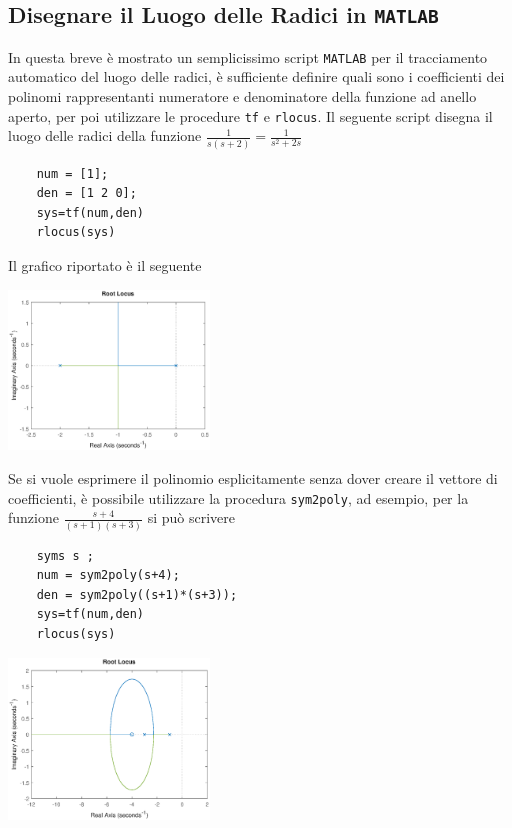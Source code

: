 \documentclass[10pt, letterpaper]{report}
\begin{document}
\subsection{Disegnare il Luogo delle Radici in \texttt{MATLAB}}
In questa breve è mostrato un semplicissimo script  \texttt{MATLAB} per il tracciamento automatico del luogo delle radici, è sufficiente definire quali sono i coefficienti dei polinomi rappresentanti numeratore e denominatore della funzione ad anello aperto, per poi utilizzare le procedure \texttt{tf} e \texttt{rlocus}. Il seguente script disegna il luogo delle radici della funzione $\frac{1}{s(s+2)}=\frac{1}{s^2+2s}$ 
\begin{lstlisting}
    num = [1];
    den = [1 2 0];
    sys=tf(num,den)
    rlocus(sys)
\end{lstlisting}
Il grafico riportato è il seguente
\begin{center}
    \includegraphics[width=0.4\textwidth ]{images/luogoRadMATLAB1.eps}
\end{center}
Se si vuole esprimere il polinomio esplicitamente senza dover creare il vettore di coefficienti, è possibile utilizzare la procedura \texttt{sym2poly}, ad esempio, per la funzione
$\frac{s+4}{(s+1)(s+3)}$ si può scrivere  
\begin{lstlisting}
    syms s ;
    num = sym2poly(s+4);
    den = sym2poly((s+1)*(s+3));
    sys=tf(num,den)
    rlocus(sys)
\end{lstlisting}
\begin{center}
    \includegraphics[width=0.4\textwidth ]{images/luogoRadMATLAB2.eps}
\end{center}
\end{document}
